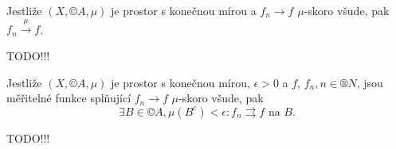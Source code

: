 \documentclass[12pt]{article}					%
\begin{document}
\begin{veta}
	Jestliže $(X, ©A, \mu)$ je prostor s konečnou mírou a $f_n \rightarrow f$ $\mu$-skoro všude, pak $f_n \overset{\mu} \rightarrow f$.

	\begin{dukazin}
		TODO!!!
	\end{dukazin}
\end{veta}

\begin{veta}[Jegorov]
	Jestliže $(X, ©A, \mu)$ je prostor s konečnou mírou, $\epsilon > 0$ a $f$, $f_n, n \in ®N$, jsou měřitelné funkce splňující $f_n \rightarrow f$ $\mu$-skoro všude, pak
	$$ \exists B \in ©A, \mu(B^c) < \epsilon: f_n \rightrightarrows f \text{ na $B$}. $$

	\begin{dukazin}
		TODO!!!
	\end{dukazin}
\end{veta}
\end{document}

